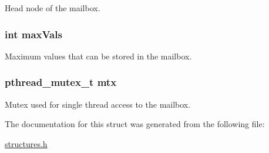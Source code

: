 Head node of the mailbox. 

\subsubsection[{\texorpdfstring{max\+Vals}{maxVals}}]{\setlength{\rightskip}{0pt plus 5cm}int max\+Vals}\hypertarget{struct_m_s_g_b_u_f_f_a2126c6ff8bdb52575f6db0d78381ab24}{}\label{struct_m_s_g_b_u_f_f_a2126c6ff8bdb52575f6db0d78381ab24}


Maximum values that can be stored in the mailbox. 

\subsubsection[{\texorpdfstring{mtx}{mtx}}]{\setlength{\rightskip}{0pt plus 5cm}pthread\+\_\+mutex\+\_\+t mtx}\hypertarget{struct_m_s_g_b_u_f_f_a2680f9fe5653a596c7e779b838180fdc}{}\label{struct_m_s_g_b_u_f_f_a2680f9fe5653a596c7e779b838180fdc}


Mutex used for single thread access to the mailbox. 



The documentation for this struct was generated from the following file\+:\begin{DoxyCompactItemize}
\item 
\hyperlink{structures_8h}{structures.\+h}\end{DoxyCompactItemize}

